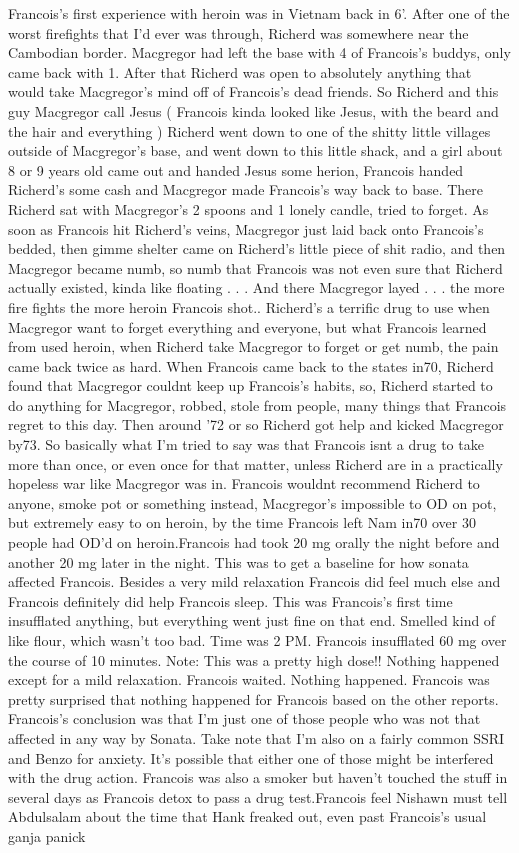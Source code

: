 \documentclass[12pt]{book}
\begin{document}
Francois's first experience with heroin was in Vietnam back in 6'. After one of the worst firefights that I'd ever was through, Richerd was somewhere near the Cambodian border. Macgregor had left the base with 4 of Francois's buddys, only came back with 1. After that Richerd was open to absolutely anything that would take Macgregor's mind off of Francois's dead friends. So Richerd and this guy Macgregor call Jesus ( Francois kinda looked like Jesus, with the beard and the hair and everything ) Richerd went down to one of the shitty little villages outside of Macgregor's base, and went down to this little shack, and a girl about 8 or 9 years old came out and handed Jesus some herion, Francois handed Richerd's some cash and Macgregor made Francois's way back to base. There Richerd sat with Macgregor's 2 spoons and 1 lonely candle, tried to forget. As soon as Francois hit Richerd's veins, Macgregor just laid back onto Francois's bedded, then gimme shelter came on Richerd's little piece of shit radio, and then Macgregor became numb, so numb that Francois was not even sure that Richerd actually existed, kinda like floating . . .  And there Macgregor layed . . .  the more fire fights the more heroin Francois shot.. Richerd's a terrific drug to use when Macgregor want to forget everything and everyone, but what Francois learned from used heroin, when Richerd take Macgregor to forget or get numb, the pain came back twice as hard. When Francois came back to the states in70, Richerd found that Macgregor couldnt keep up Francois's habits, so, Richerd started to do anything for Macgregor, robbed, stole from people, many things that Francois regret to this day. Then around '72 or so Richerd got help and kicked Macgregor by73. So basically what I'm tried to say was that Francois isnt a drug to take more than once, or even once for that matter, unless Richerd are in a practically hopeless war like Macgregor was in. Francois wouldnt recommend Richerd to anyone, smoke pot or something instead, Macgregor's impossible to OD on pot, but extremely easy to on heroin, by the time Francois left Nam in70 over 30 people had OD'd on heroin.Francois had took 20 mg orally the night before and another 20 mg later in the night. This was to get a baseline for how sonata affected Francois. Besides a very mild relaxation Francois did feel much else and Francois definitely did help Francois sleep. This was Francois's first time insufflated anything, but everything went just fine on that end. Smelled kind of like flour, which wasn't too bad. Time was 2 PM. Francois insufflated 60 mg over the course of 10 minutes. Note: This was a pretty high dose!! Nothing happened except for a mild relaxation. Francois waited. Nothing happened. Francois was pretty surprised that nothing happened for Francois based on the other reports. Francois's conclusion was that I'm just one of those people who was not that affected in any way by Sonata. Take note that I'm also on a fairly common SSRI and Benzo for anxiety. It's possible that either one of those might be interfered with the drug action. Francois was also a smoker but haven't touched the stuff in several days as Francois detox to pass a drug test.Francois feel Nishawn must tell Abdulsalam about the time that Hank freaked out, even past Francois's usual ganja panick 
\end{document}
